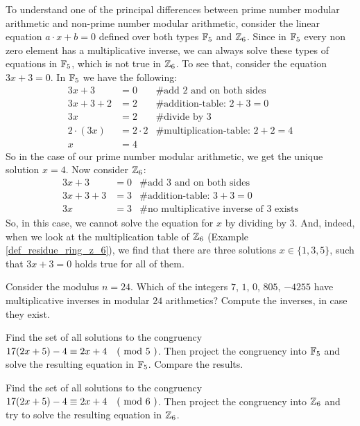 \begin{example}
To understand one of the principal differences between prime number modular arithmetic and non-prime number modular arithmetic, consider the linear equation $a\cdot x +b=0$ defined over both types $\mathbb{F}_5$ and $\mathbb{Z}_6$. Since in $\mathbb{F}_5$ every non zero element has a multiplicative inverse, we can always solve these types of equations in $\mathbb{F}_5$, which is not true in $\mathbb{Z}_6$. To see that, consider the equation $3x+3=0$. In $\mathbb{F}_5$ we have the following:
\begin{align*}
3x+3    &= 0 & \text{\# add 2 and on both sides} \\
3x+3+2  &= 2 & \text{\# addition-table: } 2+3 = 0 \\
3x      &= 2 & \text{\# divide by } 3 \\
2\cdot(3x)      &= 2\cdot 2 & \text{\# multiplication-table: } 2+2=4 \\
 x      &= 4 & 
\end{align*}
So in the case of our prime number modular arithmetic, we get the unique solution $x=4$. Now consider $\mathbb{Z}_6$:
\begin{align*}
3x+3    &= 0 & \text{\# add 3 and on both sides} \\
3x+3+3  &= 3 & \text{\# addition-table: } 3+3 = 0 \\
3x      &= 3 & \text{\# no multiplicative inverse of 3  exists}
\end{align*}
So, in this case, we cannot solve the equation for $x$ by dividing by $3$. And, indeed, when we look at the multiplication table of $\mathbb{Z}_6$ (Example \ref{def_residue_ring_z_6}), we find that there are three solutions $x\in\{1,3,5\}$, such that $3x+3=0$ holds true for all of them.
\end{example}
\begin{exercise}
Consider the modulus $n=24$. Which of the integers $7$, $1$, $0$, $805$, $-4255$ have multiplicative inverses in modular $24$ arithmetics? Compute the inverses, in case they exist.
\end{exercise}
\begin{exercise}
Find the set of all solutions to the congruency $17(2x+5)-4 \equiv 2x+4 \quad \text{( mod } 5 \text{ )}$. Then project the congruency into $\mathbb{F}_5$ and solve the resulting equation in $\mathbb{F}_5$. Compare the results. 
\end{exercise}
\begin{exercise}
Find the set of all solutions to the congruency $17(2x+5)-4 \equiv 2x+4 \quad \text{( mod } 6 \text{ )}$. Then project the congruency into $\mathbb{Z}_6$ and try to solve the resulting equation in $\mathbb{Z}_6$.
\end{exercise}

